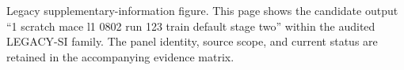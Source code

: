 Legacy supplementary-information figure. This page shows the candidate output ``1 scratch mace l1 0802 run 123 train default stage two'' within the audited LEGACY-SI family. The panel identity, source scope, and current status are retained in the accompanying evidence matrix.
